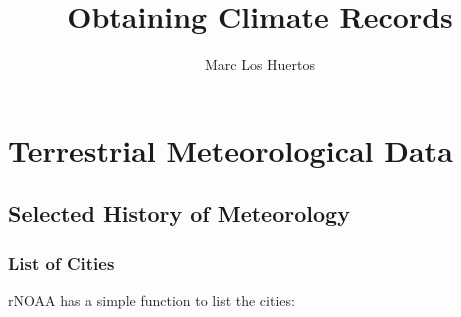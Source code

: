 \documentclass{article}\usepackage[]{graphicx}\usepackage[]{color}
\title{Obtaining Climate Records}
\author{Marc Los Huertos}
\begin{document}
\maketitle

\section{Terrestrial Meteorological Data}

\subsection{Selected History of Meteorology}



\subsubsection{List of Cities}

rNOAA has a simple function to list the cities:
\end{document}
